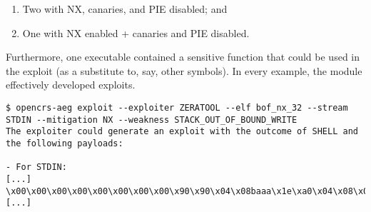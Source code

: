 \documentclass[../main.tex]{subfiles}
\begin{document}
\begin{enumerate}
  \def\labelenumi{\arabic{enumi}.}
  \tightlist
  \item
        Two with NX, canaries, and PIE disabled; and
  \item
        One with NX enabled + canaries and PIE disabled.
\end{enumerate}

Furthermore, one executable contained a sensitive function that could be used
in the exploit (as a substitute to, say, other symbols). In every example, the
module effectively developed exploits.

\begin{tiny}
\begin{verbatim}
$ opencrs-aeg exploit --exploiter ZERATOOL --elf bof_nx_32 --stream STDIN --mitigation NX --weakness STACK_OUT_OF_BOUND_WRITE
The exploiter could generate an exploit with the outcome of SHELL and the following payloads:

- For STDIN:
[...]
\x00\x00\x00\x00\x00\x00\x00\x00\x90\x90\x04\x08baaa\x1e\xa0\x04\x08\x00\x00\x00\x00\x00
[...]
\end{verbatim}
\end{tiny}
\end{document}
